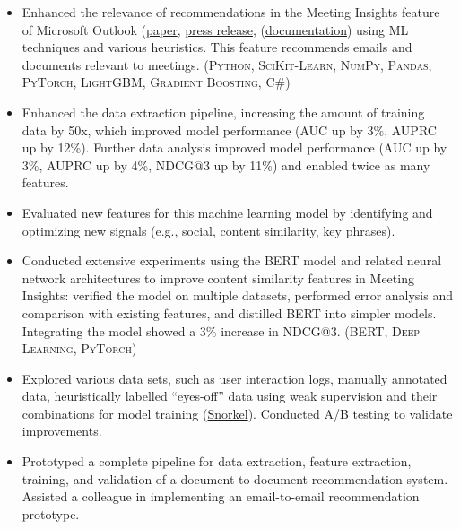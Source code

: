 \documentclass{article}
\newcommand{\mytexttilde}{\raisebox{0.5ex}{\texttildelow}}
\begin{document}
\begin{itemize}
  \begin{itemize}

  \item Enhanced the relevance of recommendations in the Meeting Insights feature of Microsoft Outlook (\href{https://www.microsoft.com/en-us/research/publication/calendar-aware-proactive-email-recommendation/}{paper}, \href{https://www.microsoft.com/en-us/research/blog/the-story-of-an-office-ai-feature-how-ai-can-promote-efficient-meeting-preparation/}{press release}, (\href{https://support.microsoft.com/en-gb/office/use-intelligent-technology-in-outlook-on-the-web-and-outlook-com-24b30683-8340-4b69-b8ac-4193ec528a70}{documentation}) using ML techniques and various heuristics. This feature recommends emails and documents relevant to meetings. (\textsc{Python}, \textsc{SciKit-Learn}, \textsc{NumPy}, \textsc{Pandas}, \textsc{PyTorch}, \textsc{LightGBM}, \textsc{Gradient Boosting}, \textsc{C\#})

  \item Enhanced the data extraction pipeline, increasing the amount of training data by \mytexttilde 50x, which improved model performance (AUC up by 3\%, AUPRC up by 12\%). Further data analysis improved model performance (AUC up by 3\%, AUPRC up by 4\%, NDCG@3 up by 11\%) and enabled twice as many features.

  \item Evaluated new features for this machine learning model by identifying and optimizing new signals (e.g., social, content similarity, key phrases).

  \item Conducted extensive experiments using the \textsc{BERT} model and related neural network architectures to improve content similarity features in Meeting Insights: verified the model on multiple datasets, performed error analysis and comparison with existing features, and distilled BERT into simpler models. Integrating the model showed a 3\% increase in NDCG@3. (\textsc{BERT}, \textsc{Deep Learning}, \textsc{PyTorch})

  \item Explored various data sets, such as user interaction logs, manually annotated data, heuristically labelled ``eyes-off'' data using weak supervision and their combinations for model training (\href{https://snorkel.ai/}{Snorkel}). Conducted A/B testing to validate improvements.

  \item Prototyped a complete pipeline for data extraction, feature extraction, training, and validation of a document-to-document recommendation system. Assisted a colleague in implementing an email-to-email recommendation prototype.


\end{itemize}
\end{itemize}
\end{document}

